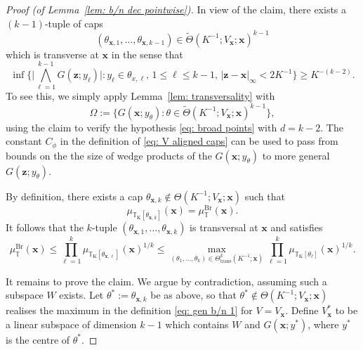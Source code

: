 \documentclass[reqno]{amsart}
\numberwithin{equation}{section}
\newcommand{\T}{\mathbb{T}}
\newcommand{\bx}{\mathbf{x}}
\newcommand{\bz}{\mathbf{z}}
\theoremstyle{plain}
\theoremstyle{definition}
\newcommand{\trans}{\mathrm{trans}}
\begin{document}
\begin{proof}[Proof (of Lemma~\ref{lem: b/n dec pointwise})]
In view of the claim, there exists a $(k-1)$-tuple of caps 
\begin{equation*}
(\theta_{\bx,1}, \dots, \theta_{\bx,k-1}) \in \widetilde{\Theta}(K^{-1}; V_{\bx}; \bx)^{k-1}
\end{equation*}
which is transverse at $\bx$ in the sense that
\begin{equation*}
        \inf  \Big\{ \Big|\bigwedge_{\ell = 1}^{k-1} G(\bz;y_{\ell}) \Big| : y_{\ell} \in \theta_{x,\ell}, \, 1 \leq \ell \leq k -1, \, |\bz-\bx|_{\infty} < 2K^{-1} \Big\}\geq K^{-(k-2)}. 
\end{equation*}
To see this, we simply apply Lemma~\ref{lem: transversality} with
\begin{equation*}
    \Omega := \big\{G(\bx; y_{\theta}) : \theta \in \widetilde{\Theta}(K^{-1}; V_{\bx}; \bx)^{k-1}\big\},
\end{equation*}
using the claim to verify the hypothesis \eqref{eq: broad points} with $d=k-2$. The constant $C_{\phi}$ in the definition of \eqref{eq: V aligned caps} can be used to pass from bounds on the the size of wedge products of the $G(\bx; y_{\theta})$ to more general $G(\bz;y_{\theta})$. 

By definition, there exists a cap $\theta_{\bx, k} \notin \Theta(K^{-1}; V_{\bx}; \bx)$ such that 
\begin{equation*}
    \mu_{\T_{\mathrm{K}}[\theta_{\bx,k}]}(\bx) = \mu_{\T}^{\mathrm{Br}}(\bx).
\end{equation*}
It follows that the $k$-tuple $(\theta_{\bx,1}, \dots, \theta_{\bx, k})$ is transversal at $\bx$ and satisfies
\begin{equation*} 
    \mu_{\T}^{\mathrm{Br}}(\bx) \leq \prod_{\ell=1}^k \mu_{\T_{\mathrm{K}}[\theta_{\bx, \ell}]}(\bx)^{1/k} \leq \max_{(\theta_1, \dots, \theta_k) \in \Theta^k_{\trans}(K^{-1}; \bx)}  \prod_{\ell = 1}^k \mu_{\T_{\mathrm{K}}[\theta_{\ell}]}(\bx)^{1/k}.
\end{equation*}
\smallskip

It remains to prove the claim. We argue by contradiction, assuming such a subspace $W$ exists. Let $\theta^* := \theta_{\bx, k}$ be as above, so that $\theta^* \notin \Theta(K^{-1}; V_{\bx}; \bx)$ realises the maximum in the definition \eqref{eq: gen b/n 1} for $V = V_{\bx}$. Define $V_{\bx}^*$ to be a linear subspace of dimension $k-1$ which contains $W$ and $G(\bx; y^*)$, where $y^*$ is the centre of $\theta^*$.


\end{proof}
\end{document}
